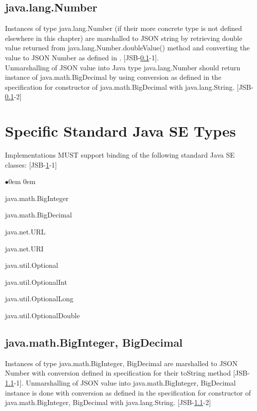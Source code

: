 \subsection{java.lang.Number}
\label{subsec:abstractnumber}
Instances of type java.lang.Number (if their more concrete type is not defined elsewhere in this chapter) are marshalled to JSON string by retrieving double value returned from java.lang.Number.doubleValue() method and converting the value to JSON Number as defined in . [JSB-\ref{subsec:abstractnumber}-1]. \\
Unmarshalling of JSON value into Java type java.lang.Number should return instance of java.math.BigDecimal by using conversion as defined in the specification for constructor of java.math.BigDecimal with java.lang.String. [JSB-\ref{subsec:abstractnumber}-2]

\section{Specific Standard Java SE Types}
\label{sec:specific}
Implementations MUST support binding of the following standard Java SE classes: [JSB-\ref{sec:specific}-1]
\begin{list}{$\bullet$}{\parsep 0em  0em}
\item java.math.BigInteger
\item java.math.BigDecimal
\item java.net.URL
\item java.net.URI
\item java.util.Optional
\item java.util.OptionalInt
\item java.util.OptionalLong
\item java.util.OptionalDouble
\end{list}

\subsection{java.math.BigInteger, BigDecimal}
\label{subsec:bignumber}
Instances of type java.math.BigInteger, BigDecimal are marshalled to JSON Number with conversion defined in specification for their toString method [JSB-\ref{subsec:bignumber}-1]. Unmarshalling of JSON value into java.math.BigInteger, BigDecimal instance is done with conversion as defined in the specification for constructor of java.math.BigInteger, BigDecimal with java.lang.String. [JSB-\ref{subsec:bignumber}-2]

